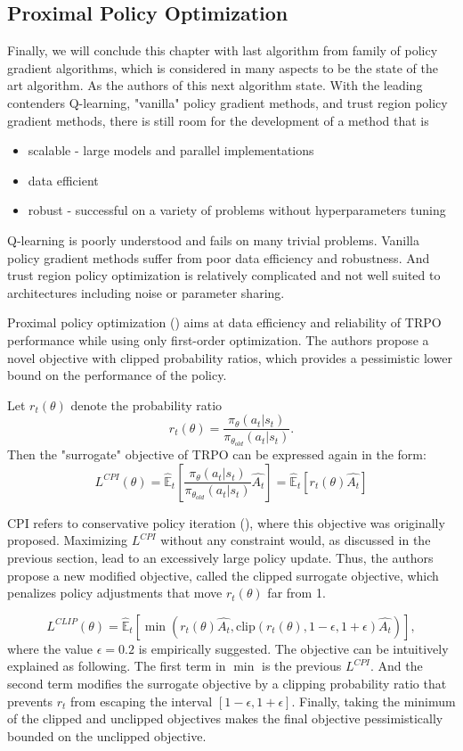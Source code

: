 \subsection{Proximal Policy Optimization}\label{PPO}
Finally, we will conclude this chapter with last algorithm from family of policy gradient algorithms, which is considered in many aspects to be the state of the art algorithm.
As the authors of this next algorithm state.
With the leading contenders Q-learning, "vanilla" policy gradient methods, and trust region policy gradient methods, there is still room for the development of a method that is
\begin{itemize}{}{}
  \item scalable - large models and parallel implementations
  \item data efficient
  \item robust - successful on a variety of problems without hyperparameters tuning
\end{itemize}

Q-learning is poorly understood and fails on many trivial problems.
Vanilla policy gradient methods suffer from poor data efficiency and robustness.
And trust region policy optimization is relatively complicated and not well suited to architectures including noise or parameter sharing.

Proximal policy optimization (\cite{PPO}) aims at data efficiency and reliability of TRPO performance while using only first-order optimization.
The authors propose a novel objective with clipped probability ratios, which provides a pessimistic lower bound on the performance of the policy.

Let $r_t(\theta)$ denote the probability ratio 
\[
  r_t(\theta) = \frac{\pi_\theta(a_t|s_t)}{\pi_{\theta_{old}}(a_t|s_t)}.
\]
Then the "surrogate" objective of TRPO can be expressed again in the form:
\[
  L^{CPI}(\theta)=\hat{\mathbb{E}}_t \left[ \frac{\pi_\theta(a_t|s_t)}{\pi_{\theta_{old}}(a_t|s_t)}\hat{A_t} \right] = \hat{\mathbb{E}}_t \left[ r_t(\theta) \hat{A_t}\right]   
\]

CPI refers to conservative policy iteration (\cite{CPI}), where this objective was originally proposed.
Maximizing $L^{CPI}$ without any constraint would, as discussed in the previous section, lead to an excessively large policy update.
Thus, the authors propose a new modified objective, called the clipped surrogate objective, which penalizes policy adjustments that move $r_t(\theta)$ far from 1.

\[
  L^{CLIP}(\theta) = \hat{\mathbb{E}}_t \left[ \min (r_t(\theta) \hat{A_t}, \textrm{clip} (r_t(\theta), 1-\epsilon, 1+\epsilon) \hat{A_t})\right],
\]
where the value $\epsilon = 0.2$ is empirically suggested. 
The objective can be intuitively explained as following.
The first term in $\min$ is the previous $L^{CPI}$.
And the second term modifies the surrogate objective by a clipping probability ratio that prevents $r_t$ from escaping the interval $[1-\epsilon, 1+ \epsilon]$.
Finally, taking the minimum of the clipped and unclipped objectives makes the final objective pessimistically bounded on the unclipped objective.

